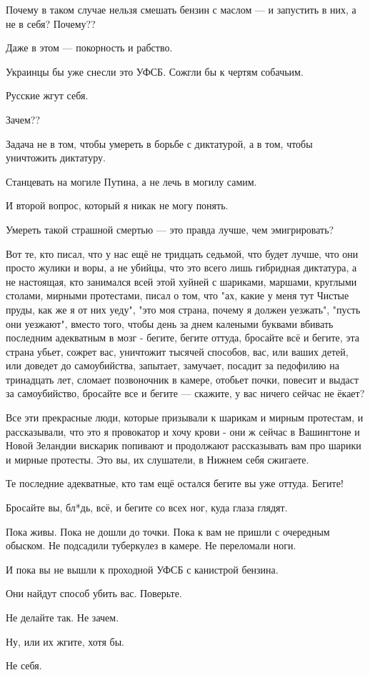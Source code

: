 Почему в таком случае нельзя смешать бензин с маслом --- и запустить в них, а не
в себя? Почему??

Даже в этом --- покорность и рабство.

Украинцы бы уже снесли это УФСБ. Сожгли бы к чертям собачьим.

Русские жгут себя.

Зачем??

Задача не в том, чтобы умереть в борьбе с диктатурой, а в том, чтобы уничтожить
диктатуру.

Станцевать на могиле Путина, а не лечь в могилу самим.

И второй вопрос, который я никак не могу понять.

Умереть такой страшной смертью --- это правда лучше, чем эмигрировать?

Вот те, кто писал, что у нас ещё не тридцать седьмой, что будет лучше, что они
просто жулики и воры, а не убийцы, что это всего лишь гибридная диктатура, а не
настоящая, кто занимался всей этой хуйней с шариками, маршами, круглыми
столами, мирными протестами, писал о том, что "ах, какие у меня тут Чистые
пруды, как же я от них уеду", "это моя страна, почему я должен уезжать", "пусть
они уезжают", вместо того, чтобы день за днем калеными буквами вбивать
последним адекватным в мозг - бегите, бегите оттуда, бросайте всё и бегите, эта
страна убьет, сожрет вас, уничтожит тысячей способов, вас, или ваших детей, или
доведет до самоубийства, запытает, замучает, посадит за педофилию на тринадцать
лет, сломает позвоночник в камере, отобьет почки, повесит и выдаст за
самоубийство, бросайте все и бегите --- скажите, у вас ничего сейчас не ёкает?

Все эти прекрасные люди, которые призывали к шарикам и мирным протестам, и
рассказывали, что это я провокатор и хочу крови - они ж сейчас в Вашингтоне и
Новой Зеландии вискарик попивают и продолжают рассказывать вам про шарики и
мирные протесты. Это вы, их слушатели, в Нижнем себя сжигаете.

Те последние адекватные, кто там ещё остался бегите вы уже оттуда. Бегите!

Бросайте вы, бл*дь, всё, и бегите со всех ног, куда глаза глядят.

Пока живы. Пока не дошли до точки. Пока к вам не пришли с очередным обыском. Не
подсадили туберкулез в камере. Не переломали ноги.

И пока вы не вышли к проходной УФСБ с канистрой бензина.

Они найдут способ убить вас. Поверьте.

Не делайте так. Не зачем.

Ну, или их жгите, хотя бы.

Не себя.
